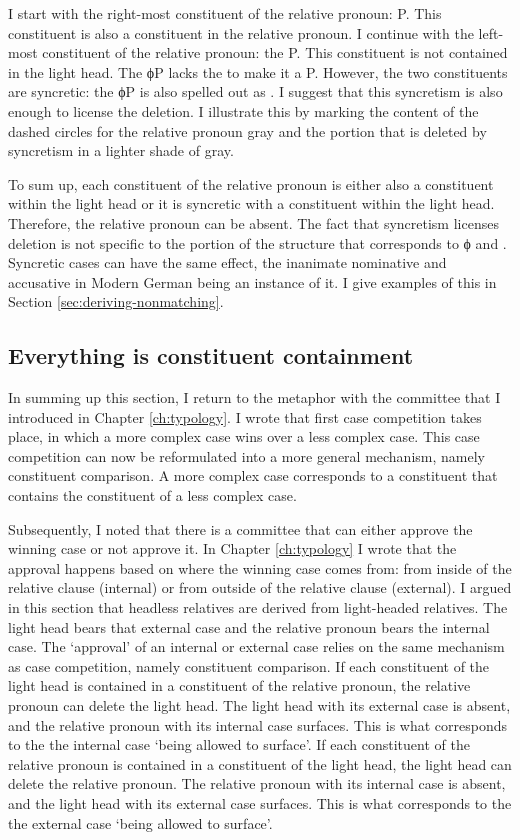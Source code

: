I start with the right-most constituent of the relative pronoun: P. This constituent is also a constituent in the relative pronoun.
I continue with the left-most constituent of the relative pronoun: the P. This constituent is not contained in the light head. The ϕP lacks the  to make it a P. However, the two constituents are syncretic: the ϕP is also spelled out as . I suggest that this syncretism is also enough to license the deletion. I illustrate this by marking the content of the dashed circles for the relative pronoun gray and the portion that is deleted by syncretism in a lighter shade of gray.

To sum up, each constituent of the relative pronoun is either also a constituent within the light head or it is syncretic with a constituent within the light head. Therefore, the relative pronoun can be absent. The fact that syncretism licenses deletion is not specific to the portion of the structure that corresponds to ϕ and . Syncretic cases can have the same effect, the inanimate nominative and accusative in Modern German being an instance of it. I give examples of this in Section \ref{sec:deriving-nonmatching}.

\subsection{Everything is constituent containment}

In summing up this section, I return to the metaphor with the committee that I introduced in Chapter \ref{ch:typology}. I wrote that first case competition takes place, in which a more complex case wins over a less complex case. This case competition can now be reformulated into a more general mechanism, namely constituent comparison. A more complex case corresponds to a constituent that contains the constituent of a less complex case.

Subsequently, I noted that there is a committee that can either approve the winning case or not approve it. In Chapter \ref{ch:typology} I wrote that the approval happens based on where the winning case comes from: from inside of the relative clause (internal) or from outside of the relative clause (external). I argued in this section that headless relatives are derived from light-headed relatives. The light head bears that external case and the relative pronoun bears the internal case. The `approval' of an internal or external case relies on the same mechanism as case competition, namely constituent comparison. If each constituent of the light head is contained in a constituent of the relative pronoun, the relative pronoun can delete the light head. The light head with its external case is absent, and the relative pronoun with its internal case surfaces. This is what corresponds to the the internal case `being allowed to surface'. If each constituent of the relative pronoun is contained in a constituent of the light head, the light head can delete the relative pronoun. The relative pronoun with its internal case is absent, and the light head with its external case surfaces. This is what corresponds to the the external case `being allowed to surface'.

